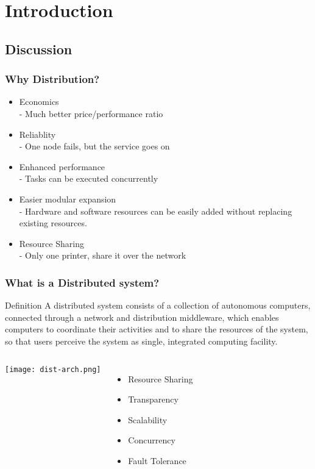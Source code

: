 \section{Introduction}



\subsection{Discussion}

\begin{frame}
    \frametitle{Why Distribution?}
    \begin{itemize}
        \item Economics \\
            - Much better price/performance ratio
        \item Reliablity \\
            - One node fails, but the service goes on
        \item Enhanced performance \\
            - Tasks can be executed concurrently
        \item Easier modular expansion \\
            - Hardware and software resources can be easily added without replacing existing resources.
        \item Resource Sharing \\
            - Only one printer, share it over the network
    \end{itemize}
\end{frame}

\begin{frame}
    \frametitle{What is a Distributed system?}
    \begin{block}{Definition}
    A distributed system consists of a \alert{collection of autonomous computers}, connected through a \alert{network} and distribution \alert{middleware}, which enables computers to coordinate their activities and to share the resources of the system, so that users perceive the system as single, integrated computing facility.
    \end{block}
    \begin{columns}
            \texttt{[image: dist-arch.png]}
            \begin{itemize}
                \item Resource Sharing
                \item Transparency
                \item Scalability
                \item Concurrency
                \item Fault Tolerance
            \end{itemize}
        \end{columns}
\end{frame}

